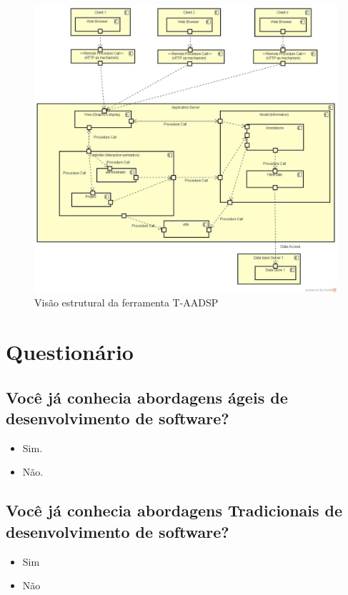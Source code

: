 \documentclass{acm_proc_article-sp}
\begin{document}
\begin{appendices}

\begin{figure}[h]
\centering %
\includegraphics[width=1\textwidth]{ArquiteturaDoProjeto.jpg} %
\caption{Visão estrutural da ferramenta T-AADSP}
\end{figure}


\section{Questionário}

\subsection{Você já conhecia abordagens ágeis de desenvolvimento de software?}
\begin{itemize}
\item Sim.
\item Não.
\end{itemize}

\subsection{Você já conhecia abordagens Tradicionais de desenvolvimento de software?}
\begin{itemize}
\item Sim
\item Não
\end{itemize}


\end{appendices}
\end{document}
